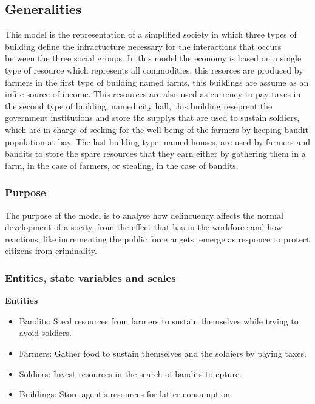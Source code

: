 \documentclass{wscpaperproc}
\theoremstyle{wsc}
\begin{document}
\subsection{Generalities}

This model is the representation of a simplified society in which three types
of building define the infractucture necessary for the interactions that occurs
between the three social groups. In this model the
economy is based on a single type of resource which represents all commodities,
this resorces are produced by farmers in the first type of building named
farms, this buildings are assume as an infite source of income. This
resources are also used as currency to pay taxes in the second type of
building, named city hall, this building reseprent the government
institutions and store the supplys that are used to sustain soldiers,
which are in charge of seeking for the well being of the farmers by
keeping bandit population at bay. The last building type, named houses,
are used by farmers and bandits to store the spare resources that they
earn either by gathering them in a farm, in the case of farmers, or
stealing, in the case of bandits.

\subsubsection{Purpose}

The purpose of the model is to analyse how delincuency affects the normal
development of a socity, from the effect that has in the workforce and how
reactions, like incrementing the public force angets, emerge as responce to
protect citizens from criminality.

\subsubsection{Entities, state variables and scales}

\noindent \textbf{Entities}

\begin{itemize}
    \item Bandits: Steal resources from farmers to sustain themselves while trying to avoid soldiers.
    \item Farmers: Gather food to sustain themselves and the soldiers by paying taxes.
    \item Soldiers: Invest resources in the search of bandits to cpture.
    \item Buildings: Store agent's resources for latter consumption.
\end{itemize}
\end{document}
